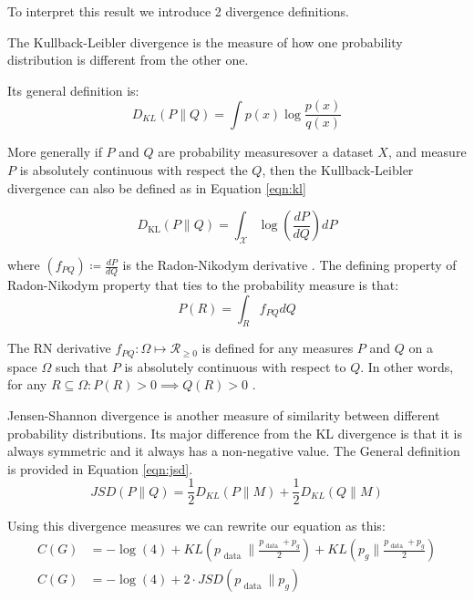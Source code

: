 To interpret this result we introduce 2 divergence definitions.
\begin{definition}
    The Kullback-Leibler divergence is the measure of how one probability distribution is different from
    the other one.   
\end{definition}
Its general definition is:
\begin{equation}
    D_{K L}(P \| Q)=\int p(x) \log \frac{p(x)}{q(x)}
\end{equation}

More generally if $P$ and $Q$ are probability measures\footnotemark  over a dataset $X$, and measure
$P$ is absolutely continuous with respect the $Q$, then the Kullback-Leibler divergence can also be
defined as in Equation \ref{eqn:kl}

\begin{equation}
    \label{eqn:kl}
    D_{\mathrm{KL}}(P \| Q)=\int_{\mathcal{X}} \log \left(\frac{d P}{d Q}\right) d P
\end{equation}

where $(f_{PQ}) \coloneqq \frac{d P}{dQ} $ is the Radon-Nikodym derivative \cite{Bill86}. The defining property of
Radon-Nikodym property that ties to the probability measure is that:
\begin{equation}
    \label{eqn:radon}
    P(R) = \int_{R} f_{PQ} d Q
\end{equation}

The RN derivative $f_{PQ} : \Omega \mapsto \mathcal{R}_{\geq 0}$ is defined for any measures $P$ and
$Q$ on a space $\Omega$ such that $P$ is absolutely continuous with respect to $Q$. In other words,
for any $ R \subseteq  \Omega : P(R) > 0 \implies Q(R) > 0$  \cite{Bill86}.

Jensen-Shannon divergence is another measure of similarity between different probability
distributions.  Its major difference from the KL divergence is that it is always symmetric and it
always has a non-negative value. The General definition is provided in Equation \ref{eqn:jsd}.
\begin{equation}
    \label{eqn:jsd}
    J S D(P \| Q)=\frac{1}{2} D_{K L}(P \| M)+\frac{1}{2} D_{K L}(Q \| M)
\end{equation}

Using this divergence measures we can rewrite our equation as this:
\begin{align}
    \label{eqn:gan_eqaul}
    C(G)&=-\log (4)+K L\left(p_{\text { data }} \| \frac{p_{\text { data }}+p_{g}}{2}\right)+K L\left(p_{g} \| \frac{p_{\text { data }}+p_{g}}{2}\right) \\
    C(G)&=-\log (4)+2 \cdot J S D\left(p_{\text { data }} \| p_{g}\right)
\end{align}

